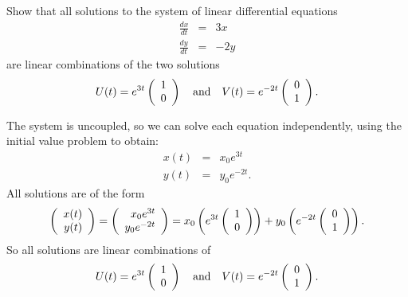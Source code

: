 \documentclass{ximera}
\begin{document}
\begin{exercise} \label{c4.4.4}
Show that all solutions to the system of linear differential equations
\begin{eqnarray*}
\frac{dx}{dt} & = & 3x \\
\frac{dy}{dt} & = & -2y
\end{eqnarray*}
are linear combinations  of the two solutions
\[
U(t) = e^{3t}\left(\begin{array}{r} 1 \\ 0\end{array}\right) \quad\mbox{and}\quad V(t) = e^{-2t}\left(\begin{array}{r} 0 \\ 1\end{array}\right).
\]

\begin{solution}

The system is uncoupled, so we can solve each equation
independently, using the initial value problem to obtain:
\[ \begin{array}{rcl}
x(t) & = & x_0e^{3t} \\
y(t) & = & y_0e^{-2t}. \end{array} \]
All solutions are of the form
\[ \left(\begin{array}{r} x(t) \\ y(t)\end{array}\right) = \left(\begin{array}{r} x_0e^{3t} \\ y_0e^{-2t}\end{array}\right)
= x_0\left(e^{3t}\left(\begin{array}{r} 1 \\ 0\end{array}\right)\right) +
y_0\left(e^{-2t}\left(\begin{array}{r} 0 \\ 1\end{array}\right)\right). \]
So all solutions are linear combinations of
\[ 
U(t) = e^{3t}\left(\begin{array}{r} 1 \\ 0\end{array}\right) \quad\mbox{and}\quad V(t) = e^{-2t}\left(\begin{array}{r} 0 \\ 1\end{array}\right). 
\]

\end{solution}
\end{exercise}
\end{document}
